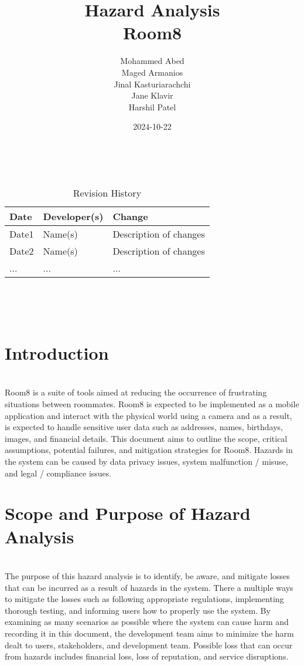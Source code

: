\documentclass{article}
\title{Hazard Analysis\\Room8}
\author{Mohammed Abed \\ 
        Maged Armanios\\
        Jinal Kasturiarachchi\\
        Jane Klavir\\
        Harshil Patel\\}
\date{2024-10-22}
\begin{document}
\maketitle
\thispagestyle{empty}

~\newpage


\begin{table}[hp]
\caption{Revision History} \label{TblRevisionHistory}
\begin{tabularx}{\textwidth}{llX}
\toprule
\textbf{Date} & \textbf{Developer(s)} & \textbf{Change}\\
\midrule
Date1 & Name(s) & Description of changes\\
Date2 & Name(s) & Description of changes\\
... & ... & ...\\
\bottomrule
\end{tabularx}
\end{table}

~\newpage

\tableofcontents

~\newpage



\section{Introduction}

\\
Room8 is a suite of tools aimed at reducing the occurrence of frustrating situations between roommates. Room8 is expected to be implemented as a mobile application and interact with the physical world using a camera and as a result, is expected to handle sensitive user data such as addresses, names, birthdays, images, and financial details. This document aims to outline the scope, critical assumptions, potential failures, and mitigation strategies for Room8. Hazards in the system can be caused by data privacy issues, system malfunction / misuse, and legal / compliance issues.


\section{Scope and Purpose of Hazard Analysis}

\\
The purpose of this hazard analysis is to identify, be aware, and mitigate losses that can be incurred as a result of hazards in the system. There a multiple ways to mitigate the losses such as following appropriate regulations, implementing thorough testing, and informing users how to properly use the system. By examining as many scenarios as possible where the system can cause harm and recording it in this document, the development team aims to minimize the harm dealt to users, stakeholders, and development team. Possible loss that can occur from hazards includes financial loss, loss of reputation, and service disruptions.   
\end{document}
